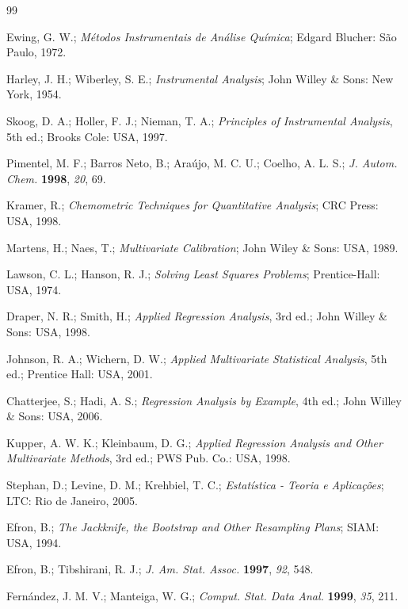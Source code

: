 \documentclass[12pt]{article}
\begin{document}
\begin{thebibliography}{99}

Ewing, G. W.; \textit{Métodos Instrumentais de Análise Química}; Edgard Blucher: São Paulo, 1972.

Harley, J. H.; Wiberley, S. E.; \textit{Instrumental Analysis}; John Willey \& Sons: New York, 1954.

Skoog, D. A.; Holler, F. J.; Nieman, T. A.; \textit{Principles of Instrumental Analysis}, 5th ed.; Brooks Cole: USA, 1997.

Pimentel, M. F.; Barros Neto, B.; Araújo, M. C. U.; Coelho, A. L. S.; \textit{J. Autom. Chem.} \textbf{1998}, \textit{20}, 69.

Kramer, R.; \textit{Chemometric Techniques for Quantitative Analysis}; CRC Press: USA, 1998.

Martens, H.; Naes, T.; \textit{Multivariate Calibration}; John Wiley \& Sons: USA, 1989.

Lawson, C. L.; Hanson, R. J.; \textit{Solving Least Squares Problems}; Prentice-Hall: USA, 1974.

Draper, N. R.; Smith, H.; \textit{Applied Regression Analysis}, 3rd ed.; John Willey \& Sons: USA, 1998.

Johnson, R. A.; Wichern, D. W.; \textit{Applied Multivariate Statistical Analysis}, 5th ed.; Prentice Hall: USA, 2001.

Chatterjee, S.; Hadi, A. S.; \textit{Regression Analysis by Example}, 4th ed.; John Willey \& Sons: USA, 2006.

Kupper, A. W. K.; Kleinbaum, D. G.; \textit{Applied Regression Analysis and Other Multivariate Methods}, 3rd ed.; PWS Pub. Co.: USA, 1998.

Stephan, D.; Levine, D. M.; Krehbiel, T. C.; \textit{Estatística - Teoria e Aplicações}; LTC: Rio de Janeiro, 2005.

Efron, B.; \textit{The Jackknife, the Bootstrap and Other Resampling Plans}; SIAM: USA, 1994.

Efron, B.; Tibshirani, R. J.; \textit{J. Am. Stat. Assoc.} \textbf{1997}, \textit{92}, 548.

Fernández, J. M. V.; Manteiga, W. G.; \textit{Comput. Stat. Data Anal.} \textbf{1999}, \textit{35}, 211.


\end{thebibliography}
\end{document}
